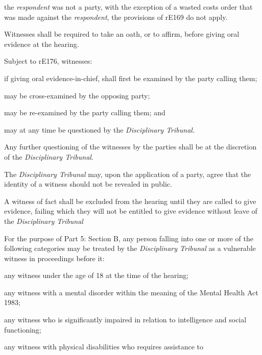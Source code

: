 the \emph{respondent} was not a party, with the exception of a wasted
costs order that was made against the \emph{respondent}, the provisions
of rE169 do not apply.\\
\par
{}
Witnesses shall be required to take an oath, or to affirm, before giving
oral evidence at the hearing.\\
\par
Subject to rE176, witnesses:\\\nl \item if giving oral evidence-in-chief, shall first be examined by the
party calling them;\item may be cross-examined by the opposing party;\item may be re-examined by the party calling them; and\item may at any time be questioned by the \emph{Disciplinary Tribunal.}\ln
{}\par
Any further questioning of the witnesses by the parties shall be at the
discretion of the \emph{Disciplinary Tribunal}.\\
\par
The \emph{Disciplinary Tribunal} may, upon the application of a party,
agree that the identity of a witness should not be revealed in public.\ln
{}\par
A witness of fact shall be excluded from the hearing until they are
called to give evidence, failing which they will not be entitled to give
evidence without leave of the \emph{Disciplinary Tribunal}\par
{}\par
{}
For the purpose of Part 5: Section B, any person falling into one or
more of the following categories may be treated by
the \emph{Disciplinary Tribunal }as a vulnerable witness in proceedings
before it:\\\nl \item any witness under the age of 18 at the time of the hearing;\item any witness with a mental disorder within the meaning of the Mental
Health Act 1983;\item any witness who is significantly impaired in relation to intelligence
and social functioning;\item any witness with physical disabilities who requires assistance to
